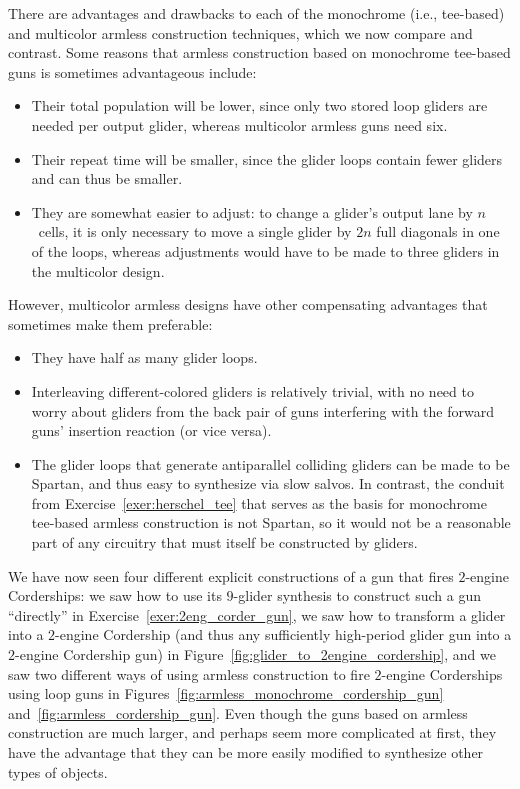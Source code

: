 There are advantages and drawbacks to each of the monochrome (i.e., tee-based) and multicolor armless construction techniques, which we now compare and contrast. Some reasons that armless construction based on monochrome tee-based guns is sometimes advantageous include:\smallskip

\begin{itemize}
	\item Their total population will be lower, since only two stored loop gliders are needed per output glider, whereas multicolor armless guns need six.\smallskip
	
	\item Their repeat time will be smaller, since the glider loops contain fewer gliders and can thus be smaller.\smallskip
	
	\item They are somewhat easier to adjust: to change a glider's output lane by $n$~cells, it is only necessary to move a single glider by $2n$ full diagonals in one of the loops, whereas adjustments would have to be made to three gliders in the multicolor design.\smallskip
\end{itemize}

However, multicolor armless designs have other compensating advantages that sometimes make them preferable:\smallskip

\begin{itemize}
	\item They have half as many glider loops.\smallskip
	
	\item Interleaving different-colored gliders is relatively trivial, with no need to worry about gliders from the back pair of guns interfering with the forward guns' insertion reaction (or vice versa).\smallskip
	
	\item The glider loops that generate antiparallel colliding gliders can be made to be Spartan, and thus easy to synthesize via slow salvos. In contrast, the conduit from Exercise~\ref{exer:herschel_tee} that serves as the basis for monochrome tee-based armless construction is not Spartan, so it would not be a reasonable part of any circuitry that must itself be constructed by gliders.\smallskip 
\end{itemize}

We have now seen four different explicit constructions of a gun that fires $2$-engine Corderships: we saw how to use its $9$-glider synthesis to construct such a gun ``directly'' in Exercise~\ref{exer:2eng_corder_gun}, we saw how to transform a glider into a $2$-engine Cordership (and thus any sufficiently high-period glider gun into a $2$-engine Cordership gun) in Figure~\ref{fig:glider_to_2engine_cordership}, and we saw two different ways of using armless construction to fire $2$-engine Corderships using loop guns in Figures~\ref{fig:armless_monochrome_cordership_gun} and~\ref{fig:armless_cordership_gun}. Even though the guns based on armless construction are much larger, and perhaps seem more complicated at first, they have the advantage that they can be more easily modified to synthesize other types of objects.

